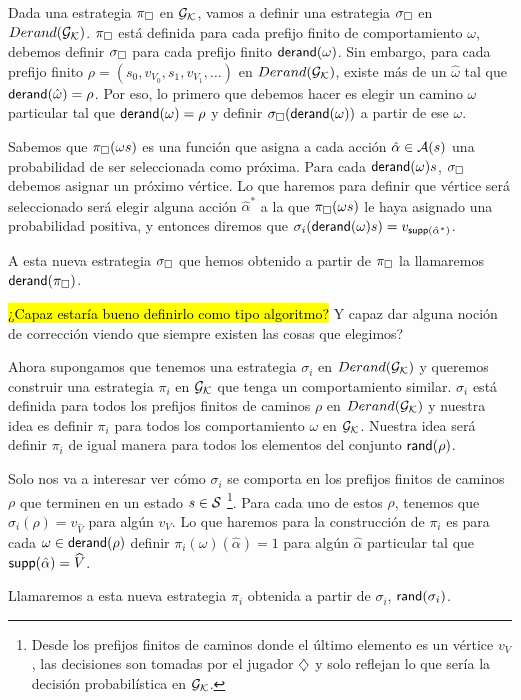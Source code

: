 \begin{definition}
	Dada una estrategia $\pi_\square$ en $\mathcal{G}_{\mathcal{K}}$, vamos a definir una estrategia $\sigma_\square$ en $Derand(\mathcal{G}_{\mathcal{K}})$. $\pi_\square$ está definida para cada prefijo finito de comportamiento $\omega$, debemos definir $\sigma_\square$ para cada prefijo finito $\textsf{derand}(\omega)$. Sin embargo, para cada prefijo finito $\rho= (s_0, v_{V_0}, s_1, v_{V_1}, \dots)$ en $Derand(\mathcal{G}_{\mathcal{K}})$, existe más de un $\hat\omega$ tal que $\textsf{derand}(\hat\omega) = \rho$. Por eso, lo primero que debemos hacer es elegir un camino $\omega$ particular tal que $\textsf{derand}(\omega) = \rho$ y definir $\sigma_\square(\textsf{derand}(\omega))$ a partir de ese $\omega$.

	Sabemos que $\pi_\square (\omega s)$ es una función que asigna a cada acción
	$\hat\alpha \in \mathcal{A}(s)$ una probabilidad de ser seleccionada como próxima.
	Para cada $\textsf{derand}(\omega)s$, $\sigma_\square$ debemos asignar un próximo
	vértice. Lo que haremos para definir que vértice será seleccionado será elegir
	alguna acción $\hat\alpha^*$ a la que $\pi_\square(\omega s)$ le haya asignado
	una probabilidad positiva, y entonces diremos que $\sigma_i(\textsf{derand}(\omega) s)
		= v_{\textsf{supp}(\hat\alpha^*)}$.


	A esta nueva estrategia $\sigma_\square$ que hemos obtenido a partir de
	$\pi_\square$ la llamaremos $\textsf{derand}(\pi_\square)$.
\end{definition}

\hl{¿Capaz estaría bueno definirlo como tipo algoritmo?} Y capaz dar alguna noción de corrección viendo que siempre existen las cosas que elegimos?

\begin{definition}
	Ahora supongamos que tenemos una estrategia $\sigma_i$ en $Derand(\mathcal{G}_{\mathcal{K}})$ y queremos construir una estrategia $\pi_i$ en $\mathcal{G}_{\mathcal{K}}$ que tenga un comportamiento similar. $\sigma_i$ está definida para todos los prefijos finitos de caminos $\rho$ en $Derand(\mathcal{G}_{\mathcal{K}})$ y nuestra idea es definir $\pi_i$ para todos los comportamiento $\omega$ en $\mathcal{G}_{\mathcal{K}}$. Nuestra idea será definir $\pi_i$ de igual manera para todos los elementos del conjunto $\textsf{rand}(\rho)$.

	Solo nos va a interesar ver cómo $\sigma_i$ se comporta en los prefijos finitos
	de caminos $\rho$ que terminen en un estado $s \in \mathcal{S}$ \footnote{Desde los
		prefijos finitos de caminos donde el último elemento es un vértice $v_V$, las
		decisiones son tomadas por el jugador $\diamondsuit$ y solo reflejan lo que sería la
		decisión probabilística en $\mathcal{G}_{\mathcal{K}}$.}. Para cada uno de estos $\rho$, tenemos que
	$\sigma_i(\rho) = v_{\widehat{V}}$ para algún $v_V$. Lo que haremos para la
	construcción de $\pi_i$ es para cada $\omega \in \textsf{derand}(\rho)$ definir
	$\pi_i(\omega)(\hat\alpha) = 1$ para algún $\hat\alpha$ particular tal que
	$\textsf{supp}(\hat\alpha) = \widehat{V}$.

	Llamaremos a esta nueva estrategia $\pi_i$ obtenida a partir de $\sigma_i$,
	$\textsf{rand}(\sigma_i)$.
\end{definition}

